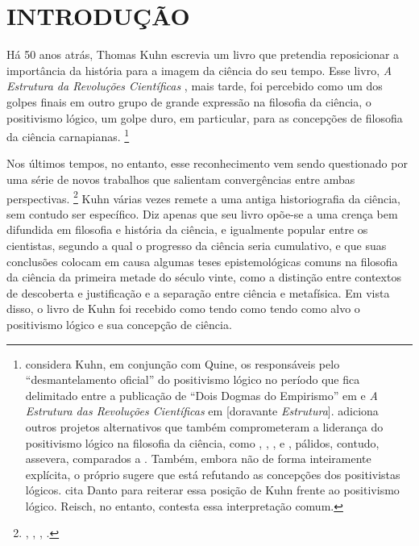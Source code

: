 \setcounter{page}{9}

\chapter*{INTRODUÇÃO}
\label{introducao}
\thispagestyle{empty}
\setlength{\baselineskip}{1.5\baselineskip}

Há 50 anos atrás, Thomas Kuhn escrevia um livro que pretendia reposicionar a importância da história para a imagem da ciência do seu tempo. 
Esse livro, \emph{A Estrutura da Revoluções Científicas} \citeyearpar{KUHN1962}, mais tarde, foi percebido como um dos golpes 
finais em outro grupo de grande expressão na filosofia da ciência, o positivismo lógico, um golpe duro, em particular, para as concepções de filosofia da ciência carnapianas.%
    \footnote{\citet[§ 1]{FRIEDMAN1999} considera Kuhn, em conjunção com Quine, os responsáveis pelo ``desmantelamento oficial'' do positivismo lógico
     no período que fica delimitado entre a publicação de ``Dois Dogmas do Empirismo'' em \citeyearpar{QUINE1951} e
      \emph{A Estrutura das Revoluções Científicas} em \citeyearpar{KUHN1962} [doravante \emph{Estrutura}].
       \citet[p. 347]{RICHARDSON2007b} adiciona outros projetos alternativos que também comprometeram a liderança do positivismo 
       lógico na filosofia da ciência, como \citet{POPPER1959}, \citet{SELLARS1963}, \citet{POLANYI1958}, \citet{HANSON1958} e \citet{SUPPE1977}, pálidos, 
       contudo, assevera, comparados a \citet{KUHN2006}. Também, embora não de forma inteiramente explícita, o próprio \citet[p. 27]{KUHN2009} 
       sugere que está refutando as concepções dos positivistas lógicos. \citet[p. 264]{REISCH1991} cita Danto \citeyearpar{DANTO1985} para 
       reiterar essa posição de Kuhn frente ao positivismo lógico. Reisch, no entanto, contesta essa interpretação comum.}

Nos últimos tempos, no entanto, esse reconhecimento vem sendo questionado por uma série de novos trabalhos que salientam convergências entre ambas perspectivas.%
    \footnote{\citet{FRIEDMAN2002}, \citet{REISCH1991}, \citet{EARMAN1993}, \citet{IRZIK1995}.}
Kuhn várias vezes remete a uma antiga historiografia da ciência, sem contudo ser específico. Diz apenas que seu livro opõe-se a uma crença bem difundida em filosofia e história da ciência, e igualmente popular entre os cientistas,  segundo a qual o progresso da ciência seria cumulativo, e que  suas conclusões colocam em causa algumas teses epistemológicas comuns na filosofia da ciência da primeira metade do século vinte, como a distinção entre contextos de descoberta e justificação e a separação entre ciência e metafísica. Em vista disso, o livro de Kuhn foi recebido como tendo como tendo como alvo o positivismo lógico e sua concepção de ciência. 

